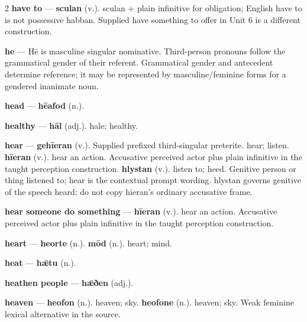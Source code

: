 \begin{multicols}{2}
\textbf{have to} — \textbf{sculan} (v.). sculan + plain infinitive for obligation; English have to is not possessive habban. Supplied have something to offer in Unit 6 is a different construction.\par
\textbf{he} — Hē is masculine singular nominative. Third-person pronouns follow the grammatical gender of their referent. Grammatical gender and antecedent determine reference; it may be represented by masculine/feminine forms for a gendered inanimate noun.\par
\textbf{head} — \textbf{hēafod} (n.).\par
\textbf{healthy} — \textbf{hāl} (adj.). hale; healthy.\par
\textbf{hear} — \textbf{gehīeran} (v.). Supplied prefixed third-singular preterite. hear; listen. \textbf{hīeran} (v.). hear an action. Accusative perceived actor plus plain infinitive in the taught perception construction. \textbf{hlystan} (v.). listen to; heed. Genitive person or thing listened to; hear is the contextual prompt wording. hlystan governs genitive of the speech heard; do not copy hīeran's ordinary accusative frame.\par
\textbf{hear someone do something} — \textbf{hīeran} (v.). hear an action. Accusative perceived actor plus plain infinitive in the taught perception construction.\par
\textbf{heart} — \textbf{heorte} (n.).  \textbf{mōd} (n.). heart; mind.\par
\textbf{heat} — \textbf{hǣtu} (n.).\par
\textbf{heathen people} — \textbf{hǣðen} (adj.).\par
\textbf{heaven} — \textbf{heofon} (n.). heaven; sky. \textbf{heofone} (n.). heaven; sky. Weak feminine lexical alternative in the source.\par

\end{multicols}
